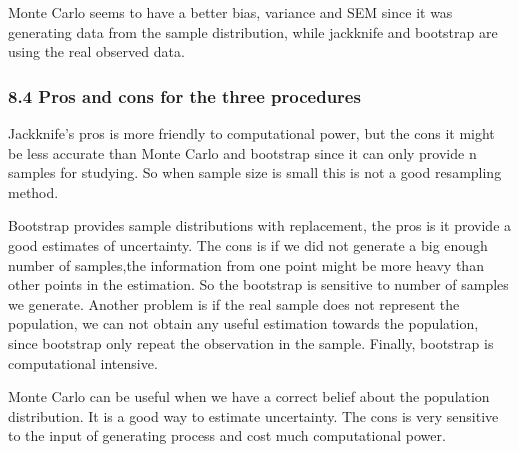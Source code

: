 \documentclass[
]{article}
\begin{document}
Monte Carlo seems to have a better bias, variance and SEM since it was
generating data from the sample distribution, while jackknife and
bootstrap are using the real observed data.

\hypertarget{pros-and-cons-for-the-three-procedures}{%
\subsubsection{8.4 Pros and cons for the three
procedures}\label{pros-and-cons-for-the-three-procedures}}

Jackknife's pros is more friendly to computational power, but the cons
it might be less accurate than Monte Carlo and bootstrap since it can
only provide n samples for studying. So when sample size is small this
is not a good resampling method.

Bootstrap provides sample distributions with replacement, the pros is it
provide a good estimates of uncertainty. The cons is if we did not
generate a big enough number of samples,the information from one point
might be more heavy than other points in the estimation. So the
bootstrap is sensitive to number of samples we generate. Another problem
is if the real sample does not represent the population, we can not
obtain any useful estimation towards the population, since bootstrap
only repeat the observation in the sample. Finally, bootstrap is
computational intensive.

Monte Carlo can be useful when we have a correct belief about the
population distribution. It is a good way to estimate uncertainty. The
cons is very sensitive to the input of generating process and cost much
computational power.
\end{document}
